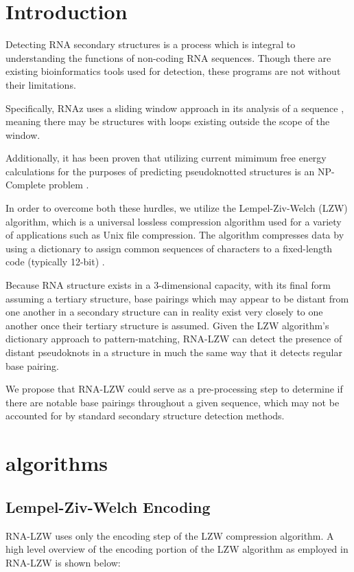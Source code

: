 \documentclass[sigconf]{acmart}
\begin{document}
\section{Introduction}
Detecting RNA secondary structures is a process which is integral to understanding the functions of non-coding RNA sequences. Though there are existing bioinformatics tools used for detection, these programs are not without their limitations. 

Specifically, RNAz uses a sliding window approach in its analysis of a sequence \cite{RNAZ2} \cite{Fast}, meaning there may be structures with loops existing outside the scope of the window.

Additionally, it has been proven that utilizing current mimimum free energy calculations for the purposes of predicting pseudoknotted structures is an NP-Complete problem \cite{NP}.

In order to overcome both these hurdles, we utilize the Lempel-Ziv-Welch (LZW) algorithm, which is a universal lossless compression algorithm used for a variety of applications such as Unix file compression. The algorithm compresses data by using a dictionary to assign common sequences of characters to a fixed-length code (typically 12-bit) \cite{compres}.

Because RNA structure exists in a 3-dimensional capacity, with its final form assuming a tertiary structure, base pairings which may appear to be distant from one another in a secondary structure can in reality exist very closely to one another once their tertiary structure is assumed. Given the LZW algorithm’s dictionary approach to pattern-matching,  RNA-LZW can detect the presence of distant pseudoknots in a structure in much the same way that it detects regular base pairing. 

We propose that RNA-LZW could serve as a pre-processing step to determine if there are notable base pairings throughout a given sequence, which may not be accounted for by standard secondary structure detection methods.

\section{algorithms}


\subsection{Lempel-Ziv-Welch Encoding}

RNA-LZW uses only the encoding step of the LZW compression algorithm.  A high level overview of the encoding portion of the LZW algorithm as employed in RNA-LZW is shown below:
\end{document}

